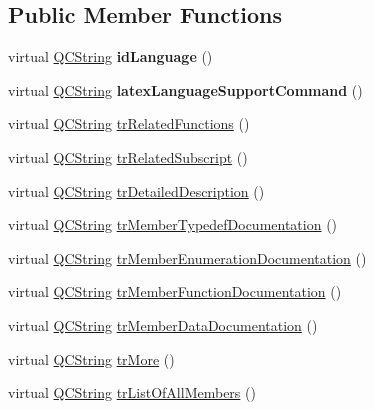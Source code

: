 \subsection*{Public Member Functions}
\begin{DoxyCompactItemize}
\item 
\mbox{\label{class_translator_czech_ad869ae218a0b8c745c67cc84d1cd26a6}} 
virtual \mbox{\hyperlink{class_q_c_string}{Q\+C\+String}} {\bfseries id\+Language} ()
\item 
\mbox{\label{class_translator_czech_a0d4f3572277741fcfa2c6bc37ab7b17d}} 
virtual \mbox{\hyperlink{class_q_c_string}{Q\+C\+String}} {\bfseries latex\+Language\+Support\+Command} ()
\item 
virtual \mbox{\hyperlink{class_q_c_string}{Q\+C\+String}} \mbox{\hyperlink{class_translator_czech_a6185da8c8ea1b0cbc444a947432dc1d8}{tr\+Related\+Functions}} ()
\item 
virtual \mbox{\hyperlink{class_q_c_string}{Q\+C\+String}} \mbox{\hyperlink{class_translator_czech_ac9d6233bcf5959199504546e62facbe8}{tr\+Related\+Subscript}} ()
\item 
virtual \mbox{\hyperlink{class_q_c_string}{Q\+C\+String}} \mbox{\hyperlink{class_translator_czech_aaf320a13caf51f252e5bdf330eadfa22}{tr\+Detailed\+Description}} ()
\item 
virtual \mbox{\hyperlink{class_q_c_string}{Q\+C\+String}} \mbox{\hyperlink{class_translator_czech_a813712a76b915e3dc85a6be76ab79b1a}{tr\+Member\+Typedef\+Documentation}} ()
\item 
virtual \mbox{\hyperlink{class_q_c_string}{Q\+C\+String}} \mbox{\hyperlink{class_translator_czech_a5b49ac1def3ed8bbf005b09f3f139737}{tr\+Member\+Enumeration\+Documentation}} ()
\item 
virtual \mbox{\hyperlink{class_q_c_string}{Q\+C\+String}} \mbox{\hyperlink{class_translator_czech_a34d478f257d27ca04cb304f458d281cd}{tr\+Member\+Function\+Documentation}} ()
\item 
virtual \mbox{\hyperlink{class_q_c_string}{Q\+C\+String}} \mbox{\hyperlink{class_translator_czech_a6b347ea533bfa4ba4b42f97cd6491af9}{tr\+Member\+Data\+Documentation}} ()
\item 
virtual \mbox{\hyperlink{class_q_c_string}{Q\+C\+String}} \mbox{\hyperlink{class_translator_czech_af60ca3006749ce45b9c6a6a099345e90}{tr\+More}} ()
\item 
virtual \mbox{\hyperlink{class_q_c_string}{Q\+C\+String}} \mbox{\hyperlink{class_translator_czech_a6506ce7e830bb5b19ec2b0b2b526149a}{tr\+List\+Of\+All\+Members}} ()

\end{DoxyCompactItemize}
